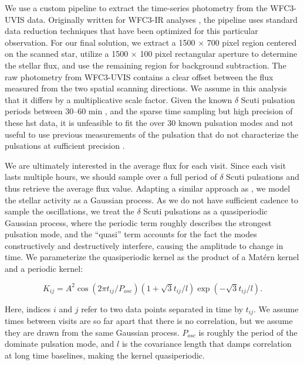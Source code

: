 \documentclass[longauth]{aa} %
\begin{document}
We use a custom pipeline to extract the time-series photometry from the WFC3-UVIS data.  Originally written for WFC3-IR analyses \citep[e.g.,][]{Stevenson2014a, Stevenson2014c}, the pipeline uses standard data reduction techniques that have been optimized for this particular observation.  For our final solution, we extract a 1500 $\times$ 700 pixel region centered on the scanned star, utilize a 1500 $\times$ 100 pixel rectangular aperture to determine the stellar flux, and use the remaining region for background subtraction.
%
The raw photometry from WFC3-UVIS contains a clear offset between the flux measured from the two spatial scanning directions.
%
We assume in this analysis that it differs by a multiplicative scale factor.
%
Given the known $\delta$ Scuti pulsation periods between 30--60 min \citep{koen2003a, koen2003b},
and the sparse time sampling but high precision of these \ac{hst} data, it is unfeasible to fit the over 30 known pulsation modes and not useful to use previous measurements of the pulsation that do not characterize the pulsations at sufficient precision \citep{Mekarnia2017}.

We are ultimately interested in the average flux for each visit.
%
Since each visit lasts multiple hours, we should sample over a full period of $\delta$ Scuti pulsations and thus retrieve the average flux value.
%
Adapting a similar approach as \citet{Johnson2015}, we model the stellar activity as a Gaussian process.
%
As we do not have sufficient cadence to sample the oscillations, we treat the $\delta$ Scuti pulsations as a quasiperiodic Gaussian process, where the periodic term roughly describes the strongest pulsation mode, and the ``quasi'' term accounts for the fact the modes constructively and destructively interfere, causing the amplitude to change in time.
%
We parameterize the quasiperiodic kernel as the product of a Mat\'ern kernel and a periodic kernel:

\begin{equation}
 K_{ij} = A^2 \cos\left(2\pi t_{ij}/P_{osc}\right) (1 + \sqrt{3}t_{ij}/l) \exp\left(-\sqrt{3}t_{ij}/l\right).
\end{equation}

Here, indices $i$ and $j$ refer to two data points separated in time by $t_{ij}$.
%
We assume times between visits are so far apart that there is no correlation, but we assume they are drawn from the same Gaussian process.
%
$P_{osc}$ is roughly the period of the dominate pulsation mode, and $l$ is the covariance length that damps correlation at long time baselines, making the kernel quasiperiodic. 
\end{document}
